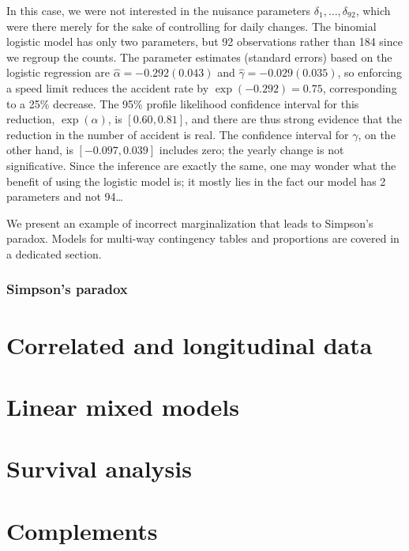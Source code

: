 \documentclass[
  11pt,
  letterpaper,
]{book}
\theoremstyle{definition}
\theoremstyle{definition}
\theoremstyle{definition}
\theoremstyle{remark}
\begin{document}
In this case, we were not interested in the nuisance parameters \(\delta_1, \ldots, \delta_{92}\), which were there merely for the sake of controlling for daily changes. The binomial logistic model has only two parameters, but 92 observations rather than 184 since we regroup the counts.
The parameter estimates (standard errors) based on the logistic regression are \(\widehat{\alpha} = -0.292 (0.043)\) and \(\widehat{\gamma}=-0.029(0.035)\), so enforcing a speed limit reduces the accident rate by \(\exp(-0.292)=0.75\), corresponding to a 25\% decrease. The 95\% profile likelihood confidence interval for this reduction, \(\exp(\alpha)\), is \([0.60, 0.81]\), and there are thus strong evidence that the reduction in the number of accident is real. The confidence interval for \(\gamma\), on the other hand, is \([-0.097, 0.039]\) includes zero; the yearly change is not significative. Since the inference are exactly the same, one may wonder what the benefit of using the logistic model is; it mostly lies in the fact our model has 2 parameters and not 94\ldots{}

We present an example of incorrect marginalization that leads to Simpson's paradox. Models for multi-way contingency tables and proportions are covered in a dedicated section.

\hypertarget{simpsons-paradox}{%
\subsection{Simpson's paradox}\label{simpsons-paradox}}

\hypertarget{correlated-longitudinal-data}{%
\chapter{Correlated and longitudinal data}\label{correlated-longitudinal-data}}

\hypertarget{linear-mixed-models}{%
\chapter{Linear mixed models}\label{linear-mixed-models}}

\hypertarget{survival}{%
\chapter{Survival analysis}\label{survival}}

\hypertarget{appendix-appendix}{%
\appendix}


\hypertarget{complement}{%
\chapter{Complements}\label{complement}}
\end{document}

